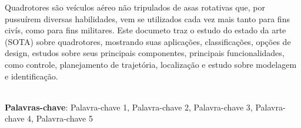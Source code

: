 \begin{thesisresumo}

Quadrotores são veículos aéreo não tripulados de asas rotativas que, por pussuírem diversas habilidades, vem se utilizados cada vez mais tanto para fins civís, como para fins militares. Este documeto traz o estudo do estado da arte (SOTA) sobre quadrotores, mostrando suas aplicações, classificações, opções de design, estudos sobre seus principais componentes, principais funcionalidades, como controle, planejamento de trajetória, localização e estudo sobre modelagem e identificação.

\ \\


\textbf{Palavras-chave}: Palavra-chave 1, Palavra-chave 2, Palavra-chave 3, Palavra-chave 4, Palavra-chave 5

\end{thesisresumo}

